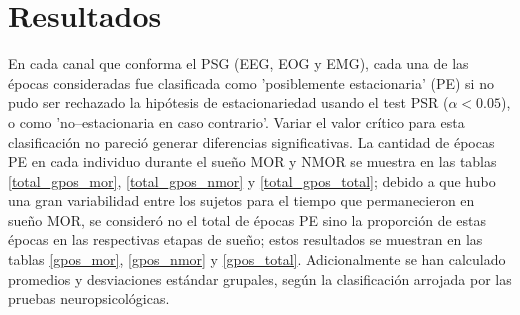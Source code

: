 \documentclass[12pt,a4paper]{mitthesis}
\begin{document}
%
%









\chapter{Resultados}

En cada canal que conforma el PSG (EEG, EOG y EMG), cada una de las \'epocas consideradas fue 
clasificada como 'posiblemente estacionaria' (PE) si no pudo ser rechazado la hip\'otesis de 
estacionariedad usando el test PSR ($\alpha < 0.05$), o como 'no--estacionaria en caso contrario'.
Variar el valor cr\'itico para esta clasificaci\'on no pareci\'o generar diferencias significativas.
La cantidad de \'epocas PE en cada individuo durante el sue\~no MOR y NMOR se muestra en las tablas 
\ref{total_gpos_mor}, \ref{total_gpos_nmor} y \ref{total_gpos_total}; debido a que hubo una gran 
variabilidad entre los sujetos para el tiempo que permanecieron en sue\~no MOR, se consider\'o no 
el total de \'epocas PE sino la proporci\'on de estas \'epocas en las respectivas etapas de sue\~no; 
estos resultados se muestran en las tablas \ref{gpos_mor}, \ref{gpos_nmor} y \ref{gpos_total}. 
Adicionalmente se han calculado promedios y desviaciones est\'andar grupales, seg\'un la
clasificaci\'on arrojada por las pruebas neuropsicol\'ogicas.
\end{document}
